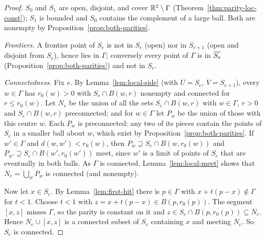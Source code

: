 \begin{proof}
$S_0$ and $S_1$ are open, disjoint, and cover $\mathbb{R}^2\setminus\Gamma$
(Theorem~\ref{thm:parity-loc-const}); $S_1$ is bounded and $S_0$ contains the complement of a large
ball. Both are nonempty by Proposition~\ref{prop:both-parities}.

\emph{Frontiers.} A frontier point of $S_e$ is not in $S_e$ (open) nor in $S_{e+1}$ (open and
disjoint from $S_e$), hence lies in $\Gamma$; conversely every point of $\Gamma$ is in $\overline{S_e}$
(Proposition~\ref{prop:both-parities}) and not in $S_e$.

\emph{Connectedness.} Fix $e$. By Lemma~\ref{lem:local-side} (with $U=S_e$, $V=S_{e+1}$), every
$w\in\Gamma$ has $r_0(w)>0$ with $S_e\cap B(w,r)$ nonempty and connected for $r\le r_0(w)$. Let
$N_e$ be the union of all the sets $S_e\cap B(w,r)$ with $w\in\Gamma$, $r>0$ and $S_e\cap B(w,r)$
preconnected; and for $w\in\Gamma$ let $P_w$ be the union of those with this centre $w$. Each $P_w$
is preconnected: any two of its pieces contain the points of $S_e$ in a smaller ball about $w$,
which exist by Proposition~\ref{prop:both-parities}. If $w'\in\Gamma$ and $d(w,w')<r_0(w)$, then
$P_w\supseteq S_e\cap B(w,r_0(w))$ and $P_{w'}\supseteq S_e\cap B(w',r_0(w'))$ meet, since $w'$ is a
limit of points of $S_e$ that are eventually in both balls. As $\Gamma$ is connected,
Lemma~\ref{lem:local-meet} shows that $N_e=\bigcup_{w}P_w$ is connected (and nonempty).

Now let $x\in S_e$. By Lemma~\ref{lem:first-hit} there is $p\in\Gamma$ with
$x+t(p-x)\notin\Gamma$ for $t<1$. Choose $t<1$ with $z=x+t(p-x)\in B(p,r_0(p))$. The segment
$[x,z]$ misses $\Gamma$, so the parity is constant on it and $z\in S_e\cap B(p,r_0(p))\subseteq N_e$.
Hence $N_e\cup[x,z]$ is a connected subset of $S_e$ containing $x$ and meeting $N_e$. So $S_e$ is
connected.
\end{proof}


